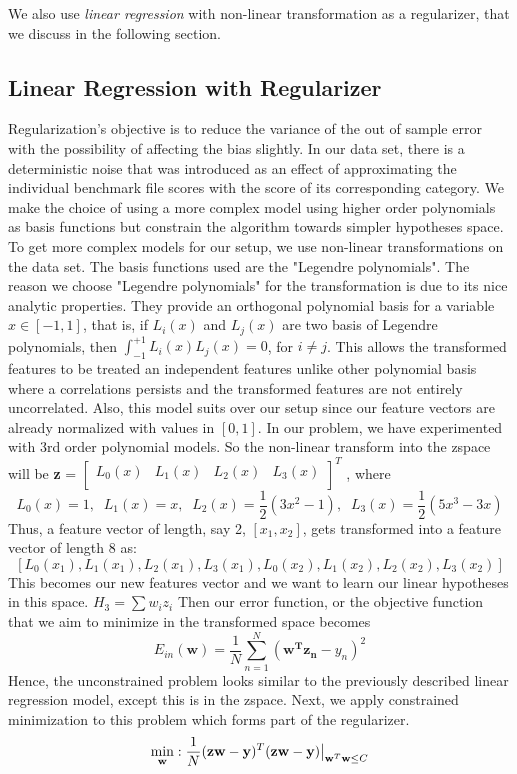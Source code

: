 We also use \emph{linear regression} with non-linear transformation as a regularizer, that we discuss in the following section.

\subsection{Linear Regression with Regularizer}
Regularization's objective is to reduce the variance of the out of sample error with the possibility of affecting the bias slightly. 
In our data set, there is a deterministic noise that was introduced as an effect of approximating the individual benchmark file scores with the score of its corresponding category. We make the choice of using a more complex model using higher order polynomials as basis functions but constrain the algorithm towards simpler hypotheses space.\newline
To get more complex models for our setup, we use non-linear transformations on the data set. The basis functions used are the "Legendre polynomials". The reason we choose "Legendre polynomials" for the transformation is due to its nice analytic properties. They provide an orthogonal polynomial basis for a variable $x \in [-1,1]$, that is, if $L_i(x)$ and $L_j(x)$ are two basis of Legendre polynomials, then $\int_{-1}^{+1} L_i(x)L_j(x) = 0$, for $i \neq j$. This allows the transformed features to be treated an independent features unlike other polynomial basis where a correlations persists and the transformed features are not entirely uncorrelated. Also, this model suits over our setup since our feature vectors are already normalized with values in $[0, 1]$. \newline
In our problem, we have experimented with 3rd order polynomial models. So the non-linear transform into the zspace will be \textbf{z} =  $\begin{bmatrix}
  L_0(x) &  L_1(x) &  L_2(x) &  L_3(x) \\
\end{bmatrix}^T$ , where \newline
\[L_0(x) = 1, \;\; L_1(x) = x, \;\; L_2(x) = \dfrac{1}{2}(3x^2 - 1), \;\; L_3(x) = \dfrac{1}{2}(5x^3 - 3x) \]
Thus, a feature vector of length, say 2, $[x_1,x_2]$, gets transformed into a feature vector of length 8 as:
\[[L_0(x_1),L_1(x_1),L_2(x_1),L_3(x_1),L_0(x_2),L_1(x_2),L_2(x_2),L_3(x_2)]\]
This becomes our new features vector and we want to learn our linear hypotheses in this space. $H_3 = \sum w_iz_i$ \newline
Then our error function, or the objective function that we aim to minimize in the transformed space becomes
\[ E_{in}(\mathbf{w}) = \dfrac{1}{N}\sum_{n=1}^{N}(\mathbf{w^Tz_n} - y_n)^2 \]
Hence, the unconstrained problem looks similar to the previously described linear regression model, except this is in the zspace. \newline
Next, we apply constrained minimization to this problem which forms part of the regularizer. 
\[\min_{\mathbf{w}} : \dfrac{1}{N}({\bf z} {\bf w}-{\bf y})^T({\bf z} {\bf w} - {\bf y}) \big |_{{\bf w}^T {\bf w} \leq C}\]

